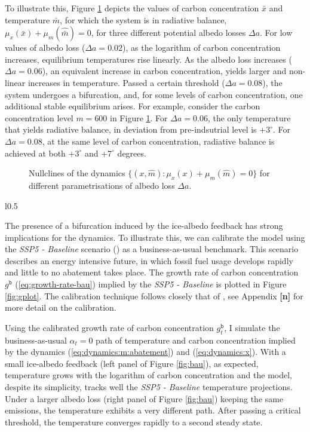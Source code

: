 \documentclass[../../main.tex]{subfiles}
\begin{document}
To illustrate this, Figure \ref{fig:nullclines} depicts the values of carbon concentration $\bar x$ and temperature $\bar m$, for which the system is in radiative balance, $\mu_x(\bar x) + \mu_m(\hat{\bar{m}}) = 0$, for three different potential albedo losses $\Delta a$. For low values of albedo loss ($\Delta a = 0.02$), as the logarithm of carbon concentration increases, equilibrium temperatures rise linearly. As the albedo loss increases ($\Delta a = 0.06$), an equivalent increase in carbon concentration, yields larger and non-linear increases in temperature. Passed a certain threshold ($\Delta a = 0.08$), the system undergoes a bifurcation, and, for some levels of carbon concentration, one additional stable equilibrium arises. For example, consider the carbon concentration level $m = 600$ in Figure \ref{fig:nullclines}. For $\Delta a = 0.06$, the only temperature that yields radiative balance, in deviation from pre-indsutrial level is $+3^\circ$. For $\Delta a = 0.08$, at the same level of carbon concentration, radiative balance is achieved at both $+3^\circ$ and $+7^\circ$ degrees. 

\begin{figure}[H]
    \centering
    \caption{Nullclines of the dynamics $\{(x, \hat{m}): \mu_x( x) + \mu_m(\hat{m}) = 0\}$ for different parametrisations of albedo loss $\Delta a$.}
    \label{fig:nullclines}
\end{figure}

\begin{wrapfigure}{l}{0.5\textwidth}
    \caption{}
    \label{fig:gplot}
\end{wrapfigure}
The presence of a bifurcation induced by the ice-albedo feedback has strong implications for the dynamics. To illustrate this, we can calibrate the model using the \textit{SSP5 - Baseline} scenario (\cite{kriegler_fossil-fueled_2017}) as a business-as-usual benchmark. This scenario describes an energy intensive future, in which fossil fuel usage develops rapidly and little to no abatement takes place. The growth rate of carbon concentration $g^{\mathtt{b}}$ (\ref{eq:growth-rate-bau}) implied by the \textit{SSP5 - Baseline} is plotted in Figure \ref{fig:gplot}. The calibration technique follows closely that of , see Appendix \textbf{[n]} for more detail on the calibration.

Using the calibrated growth rate of carbon concentration $g^{\mathtt{b}}_t$, I simulate the business-as-usual $\alpha_t = 0$ path of temperature and carbon concentration implied by the dynamics (\ref{eq:dynamics:m:abatement}) and (\ref{eq:dynamics:x}). With a small ice-albedo feedback (left panel of Figure \ref{fig:bau}), as expected, temperature grows with the logarithm of carbon concentration and the model, despite its simplicity, tracks well the \textit{SSP5 - Baseline} temperature projections. Under a larger albedo loss (right panel of Figure \ref{fig:bau}) keeping the same emissions, the temperature exhibits a very different path. After passing a critical threshold, the temperature converges rapidly to a second steady state.
\end{document}
